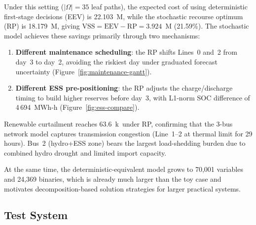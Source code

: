 \documentclass[11pt]{article}
\begin{document}
Under this setting ($|\Omega|=35$ leaf paths), the expected cost of
using deterministic first-stage decisions (EEV) is
22.103~M\textyen, while the stochastic recourse optimum (RP) is
18.179~M\textyen, giving
$\mathrm{VSS}=\mathrm{EEV}-\mathrm{RP}=3.924$~M\textyen
(21.59\%). The stochastic model achieves these savings primarily
through two mechanisms:
\begin{enumerate}[nosep]
  \item \textbf{Different maintenance scheduling}: the RP shifts
    Lines~0 and~2 from day~3 to day~2, avoiding the riskiest day
    under graduated forecast uncertainty
    (Figure~\ref{fig:maintenance-gantt}).
  \item \textbf{Different ESS pre-positioning}: the RP adjusts the
    charge/discharge timing to build higher reserves before
    day~3, with L1-norm SOC difference of 4\,694~MWh-h
    (Figure~\ref{fig:ess-compare}).
\end{enumerate}
Renewable curtailment reaches 63.6~k\textyen\ under RP,
confirming that the 3-bus network model captures transmission
congestion (Line~1--2 at thermal limit for 29 hours). Bus~2
(hydro+ESS zone) bears the largest load-shedding burden due to
combined hydro drought and limited import capacity.

At the same time, the deterministic-equivalent model grows to
70,001 variables and 24,369 binaries, which is already much larger
than the toy case and motivates decomposition-based solution
strategies for larger practical systems.

\subsection{Test System}\label{sec:test-system}
\end{document}
